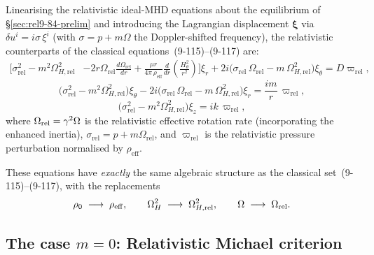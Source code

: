 Linearising the relativistic ideal-MHD equations about the
equilibrium of \S\ref{sec:rel9-84-prelim} and introducing the
Lagrangian displacement $\boldsymbol{\xi}$ via
$\delta u^{i} = i\sigma\,\xi^{i}$ (with $\sigma = p + m\Omega$ the
Doppler-shifted frequency), the relativistic counterparts of the
classical equations~(9-115)--(9-117) are:
\begin{align}
  \biggl[\sigma_{\mathrm{rel}}^{2}
  - m^{2}\Omega_{H,\mathrm{rel}}^{2}
  &- 2r\Omega_{\mathrm{rel}}\frac{d\Omega_{\mathrm{rel}}}{dr}
  + \frac{\mu r}{4\pi\,\rho_{\mathrm{eff}}}
    \frac{d}{dr}\!\left(\frac{H_\theta^{2}}{r^{2}}\right)
  \biggr]\xi_r
  + 2i\bigl(\sigma_{\mathrm{rel}}\,\Omega_{\mathrm{rel}}
    - m\,\Omega_{H,\mathrm{rel}}^{2}\bigr)\xi_\theta
  = D\varpi_{\mathrm{rel}},
  \label{eq:rel9-115}
\end{align}
\begin{equation}
  \bigl(\sigma_{\mathrm{rel}}^{2}
  - m^{2}\Omega_{H,\mathrm{rel}}^{2}\bigr)\xi_\theta
  - 2i\bigl(\sigma_{\mathrm{rel}}\,\Omega_{\mathrm{rel}}
    - m\,\Omega_{H,\mathrm{rel}}^{2}\bigr)\xi_r
  = \frac{im}{r}\,\varpi_{\mathrm{rel}},
  \label{eq:rel9-116}
\end{equation}
\begin{equation}
  \bigl(\sigma_{\mathrm{rel}}^{2}
  - m^{2}\Omega_{H,\mathrm{rel}}^{2}\bigr)\xi_z
  = ik\,\varpi_{\mathrm{rel}},
  \label{eq:rel9-117}
\end{equation}
where $\Omega_{\mathrm{rel}} = \gamma^{2}\Omega$ is the
relativistic effective rotation rate (incorporating the enhanced
inertia), $\sigma_{\mathrm{rel}} = p + m\Omega_{\mathrm{rel}}$,
and $\varpi_{\mathrm{rel}}$ is the relativistic pressure
perturbation normalised by $\rho_{\mathrm{eff}}$.

These equations have \emph{exactly} the same algebraic structure as
the classical set~(9-115)--(9-117), with the replacements
\begin{equation}
  \rho_0 \;\longrightarrow\; \rho_{\mathrm{eff}},
  \qquad
  \Omega_H^{2} \;\longrightarrow\; \Omega_{H,\mathrm{rel}}^{2},
  \qquad
  \Omega \;\longrightarrow\; \Omega_{\mathrm{rel}}.
  \label{eq:rel9-dictionary}
\end{equation}

\subsection{The case $m = 0$: Relativistic Michael criterion}
\label{sec:rel9-84-m0}

